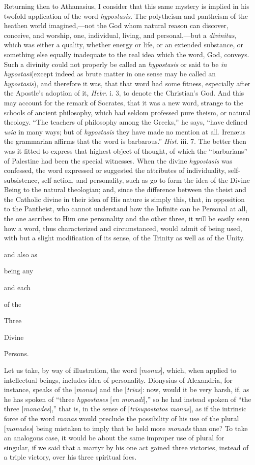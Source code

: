 Returning then to Athanasius, I consider
that this same mystery is implied in his twofold application
of the word \emph{hypostasis}. The polytheism and pantheism of
the heathen world imagined,—not the God whom natural reason
can discover, conceive, and worship, one, individual, living,
and personal,—but a \emph{divinitas}, which was either a
quality, whether energy or life, or an extended substance, or
something else equally inadequate to the real idea which the
word, God, conveys. Such a divinity could not properly be
called an \emph{hypostasis} or said to be \emph{in hypostasi}(except
indeed as brute matter in one sense may be called an \emph{hypostasis}),
and therefore it was, that that word had some fitness,
especially after the Apostle's adoption of it, \emph{Hebr}. i.
3, to denote the Christian's God. And this may account for the
remark of Socrates, that it was a new word, strange to the
schools of ancient philosophy, which had seldom professed pure
theism, or natural theology. ``The teachers of philosophy among
the Greeks,'' he says, ``have defined \emph{usia} in many ways;
but of \emph{hypostasis} they have made no mention at all.
Irenæus the grammarian affirms that the word is barbarous.'' \emph{Hist}.
iii. 7. The better then was it fitted to express that highest
object of thought, of which the ``barbarians'' of Palestine had
been the special witnesses. When the divine \emph{hypostasis}
was confessed, the word expressed or suggested the
attributes of individuality, self-subsistence, self-action,
and personality, such as go to form the idea of the Divine
Being to the natural theologian; and, since the difference
between the theist and the Catholic divine in their idea of
His nature is simply this, that, in opposition to the
Pantheist, who cannot understand how the Infinite can be
Personal at all, the one ascribes to Him one personality and
the other three, it will be easily seen how a word, thus
characterized and circumstanced, would admit of being used,
with but a slight modification of its sense, of the Trinity as
well as of the Unity.

and also as

being any

and each

of the

Three

Divine

Persons.

Let us take, by way of illustration, the
word [\emph{monas}], which, when applied to intellectual
beings, includes idea of personality. Dionysius of Alexandria,
for instance, speaks of the [\emph{monas}] and the [\emph{trias}]:
now, would it be very harsh, if, as he has spoken of ``three \emph{hypostases}
[\emph{en monadi}],'' so he had instead spoken of ``the three [\emph{monades}],''
that is, in the sense of [\emph{trisupostatos monas}], as if
the intrinsic force of the word \emph{monas} would preclude
the possibility of his use of the plural [\emph{monades}]
being mistaken to imply that be held more \emph{monads} than
one? To take an analogous case, it would be about the same
improper use of plural for singular, if we said that a martyr
by his one act gained three victories, instead of a triple
victory, over his three spiritual foes.


